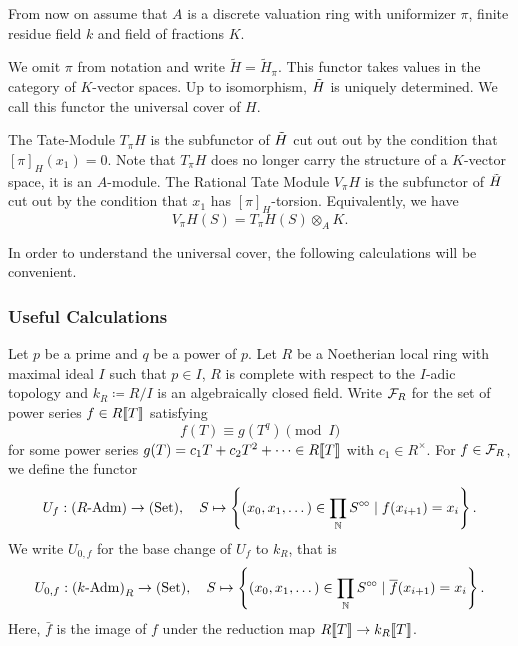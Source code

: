 \documentclass[../main.tex]{subfiles}
\begin{document}
From now on assume that $A$ is a discrete valuation ring with uniformizer
$\pi$, finite residue field $k$ and field of fractions $K$. 
\begin{defi}
  We omit $\pi$ from notation and write $\tilde H = \tilde H_\pi$. This functor
  takes values in the category of $K$-vector spaces.
  Up to isomorphism, $\Tilde H$ is uniquely determined. We call this functor
  the universal cover of $H$. 

  The Tate-Module $T_\pi H$ is the subfunctor of $\Tilde H$ cut out out
  by the condition that $[\pi]_H(x_1) = 0$. Note that $T_\pi H$ does no longer 
  carry the structure of a $K$-vector space, it is an $A$-module. The Rational
  Tate Module $V_\pi H$ is the subfunctor of $\Tilde H$ cut out by the
  condition that $x_1$ has $[\pi]_H$-torsion. Equivalently, we have 
  \begin{equation*}
    V_\pi H (S) = T_\pi H(S) \otimes_A K.
  \end{equation*}
\end{defi}

In order to understand the universal cover, the following calculations will
be convenient. 

\subsubsection{Useful Calculations} %
\label{ssub:Useful Calculations}
Let $p$ be a prime and $q$ be a power of $p$.
Let $R$ be a Noetherian local ring with maximal ideal $I$ such that 
$p \in I$, $R$ is complete with respect to the $I$-adic topology and $k_R
\coloneqq R/I$ is an
algebraically closed field. 
Write $\mathcal{F}_R$ for the set of power series $f \in R\llbracket T \rrbracket$ satisfying 
\begin{equation} \label{eq:condonpowerseries}
  f(T) \equiv g(T^q) \pmod I
\end{equation}
for some power series $g(T) = c_1 T + c_2 T^2 + \dots \in R\llbracket T \rrbracket$ with 
$c_1 \in R^\times$. 
For $f \in \mathcal{F}_R$, we define the functor
\begin{equation*}
  U_f: {({R}\text-\mathrm{Adm})} \to {(\mathrm{Set})}, \quad S \mapsto \left\{(x_0,x_1, \dots) \in \prod_{\mathbb{N}} S^{\circ \hspace{-0.5pt} \circ} 
                                          \mid f(x_{i+1}) = x_i\right\}.
\end{equation*}
We write $U_{0,f}$ for the base change of $U_f$ to $k_R$, that is
\begin{equation*}
  U_{0,f}: {({k}\text-\mathrm{Adm})}_R \to {(\mathrm{Set})}, \quad S \mapsto \left\{(x_0,x_1, \dots) \in
                              \prod_{\mathbb{N}} S^{\circ \hspace{-0.5pt} \circ} \mid \overline f(x_{i+1}) = x_i\right\}.
\end{equation*}
Here, $\bar f$ is the image of $f$ under the reduction map $R\llbracket T \rrbracket \to
k_R\llbracket T \rrbracket$. 
\end{document}

